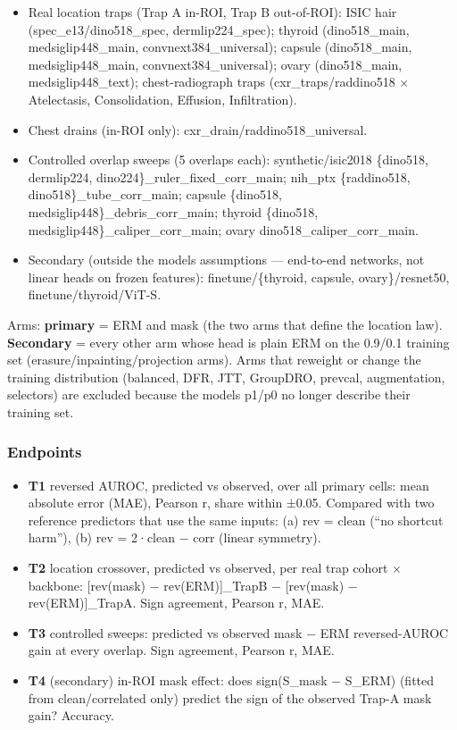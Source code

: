 {\begin{itemize}
\item
  Real location traps (Trap A in-ROI, Trap B out-of-ROI): ISIC hair (spec\_e13/dino518\_spec, dermlip224\_spec); thyroid
  (dino518\_main, medsiglip448\_main, convnext384\_universal); capsule (dino518\_main, medsiglip448\_main,
  convnext384\_universal); ovary (dino518\_main, medsiglip448\_text); chest-radiograph traps (cxr\_traps/raddino518 ×
  Atelectasis, Consolidation, Effusion, Infiltration).
\item
  Chest drains (in-ROI only): cxr\_drain/raddino518\_universal.
\item
  Controlled overlap sweeps (5 overlaps each): synthetic/isic2018 \{dino518, dermlip224, dino224\}\_ruler\_fixed\_corr\_main;
  nih\_ptx \{raddino518, dino518\}\_tube\_corr\_main; capsule \{dino518, medsiglip448\}\_debris\_corr\_main; thyroid
  \{dino518, medsiglip448\}\_caliper\_corr\_main; ovary dino518\_caliper\_corr\_main.
\item
  Secondary (outside the model\textquotesingle s assumptions --- end-to-end networks, not linear heads on frozen features):
  finetune/\{thyroid, capsule, ovary\}/resnet50, finetune/thyroid/ViT-S.
\end{itemize}

Arms: \textbf{primary} = ERM and mask (the two arms that define the location law). \textbf{Secondary} = every other arm whose
head is plain ERM on the 0.9/0.1 training set (erasure/inpainting/projection arms). Arms that reweight or change the
training distribution (balanced, DFR, JTT, GroupDRO, prevcal, augmentation, selectors) are excluded because the
model\textquotesingle s p1/p0 no longer describe their training set.

\subsubsection{Endpoints}\label{endpoints}

\begin{itemize}

\item
  \textbf{T1} reversed AUROC, predicted vs observed, over all primary cells: mean absolute error (MAE), Pearson r,
  share within ±0.05. Compared with two reference predictors that use the same inputs: (a) rev = clean (``no shortcut
  harm''), (b) rev = 2·clean − corr (linear symmetry).
\item
  \textbf{T2} location crossover, predicted vs observed, per real trap cohort × backbone:
  {[}rev(mask) − rev(ERM){]}\_TrapB − {[}rev(mask) − rev(ERM){]}\_TrapA. Sign agreement, Pearson r, MAE.
\item
  \textbf{T3} controlled sweeps: predicted vs observed mask − ERM reversed-AUROC gain at every overlap. Sign agreement,
  Pearson r, MAE.
\item
  \textbf{T4} (secondary) in-ROI mask effect: does sign(S\_mask − S\_ERM) (fitted from clean/correlated only) predict the
  sign of the observed Trap-A mask gain? Accuracy.
\end{itemize}

}
